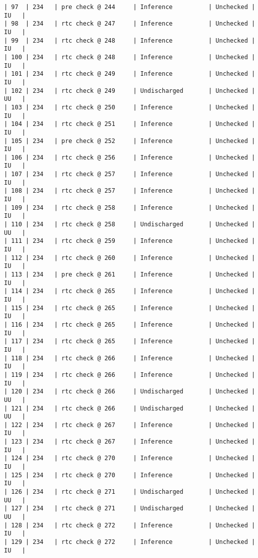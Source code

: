 \begin{lstlisting}[frame=single, gobble=0, caption={POGS report for PCA Pump prototype}]
| 97  | 234   | pre check @ 244     | Inference          | Unchecked |   IU   |
| 98  | 234   | rtc check @ 247     | Inference          | Unchecked |   IU   |
| 99  | 234   | rtc check @ 248     | Inference          | Unchecked |   IU   |
| 100 | 234   | rtc check @ 248     | Inference          | Unchecked |   IU   |
| 101 | 234   | rtc check @ 249     | Inference          | Unchecked |   IU   |
| 102 | 234   | rtc check @ 249     | Undischarged       | Unchecked |   UU   |
| 103 | 234   | rtc check @ 250     | Inference          | Unchecked |   IU   |
| 104 | 234   | rtc check @ 251     | Inference          | Unchecked |   IU   |
| 105 | 234   | pre check @ 252     | Inference          | Unchecked |   IU   |
| 106 | 234   | rtc check @ 256     | Inference          | Unchecked |   IU   |
| 107 | 234   | rtc check @ 257     | Inference          | Unchecked |   IU   |
| 108 | 234   | rtc check @ 257     | Inference          | Unchecked |   IU   |
| 109 | 234   | rtc check @ 258     | Inference          | Unchecked |   IU   |
| 110 | 234   | rtc check @ 258     | Undischarged       | Unchecked |   UU   |
| 111 | 234   | rtc check @ 259     | Inference          | Unchecked |   IU   |
| 112 | 234   | rtc check @ 260     | Inference          | Unchecked |   IU   |
| 113 | 234   | pre check @ 261     | Inference          | Unchecked |   IU   |
| 114 | 234   | rtc check @ 265     | Inference          | Unchecked |   IU   |
| 115 | 234   | rtc check @ 265     | Inference          | Unchecked |   IU   |
| 116 | 234   | rtc check @ 265     | Inference          | Unchecked |   IU   |
| 117 | 234   | rtc check @ 265     | Inference          | Unchecked |   IU   |
| 118 | 234   | rtc check @ 266     | Inference          | Unchecked |   IU   |
| 119 | 234   | rtc check @ 266     | Inference          | Unchecked |   IU   |
| 120 | 234   | rtc check @ 266     | Undischarged       | Unchecked |   UU   |
| 121 | 234   | rtc check @ 266     | Undischarged       | Unchecked |   UU   |
| 122 | 234   | rtc check @ 267     | Inference          | Unchecked |   IU   |
| 123 | 234   | rtc check @ 267     | Inference          | Unchecked |   IU   |
| 124 | 234   | rtc check @ 270     | Inference          | Unchecked |   IU   |
| 125 | 234   | rtc check @ 270     | Inference          | Unchecked |   IU   |
| 126 | 234   | rtc check @ 271     | Undischarged       | Unchecked |   UU   |
| 127 | 234   | rtc check @ 271     | Undischarged       | Unchecked |   UU   |
| 128 | 234   | rtc check @ 272     | Inference          | Unchecked |   IU   |
| 129 | 234   | rtc check @ 272     | Inference          | Unchecked |   IU   |

\end{lstlisting}
